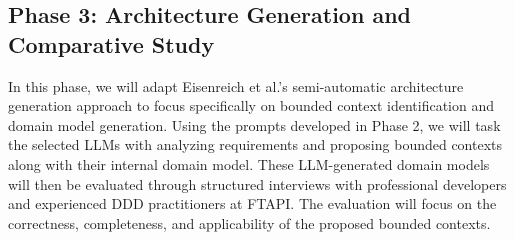 \documentclass[12pt,a4paper]{article}
\begin{document}
\subsection{Phase 3: Architecture Generation and Comparative Study}
In this phase, we will adapt Eisenreich et al.'s semi-automatic architecture generation approach to focus specifically on bounded context identification and domain model generation. Using the prompts developed in Phase 2, we will task the selected LLMs with analyzing requirements and proposing bounded contexts along with their internal domain model. These LLM-generated domain models will then be evaluated through structured interviews with professional developers and experienced DDD practitioners at FTAPI. The evaluation will focus on the correctness, completeness, and applicability of the proposed bounded contexts.

\printbibliography
\end{document}
